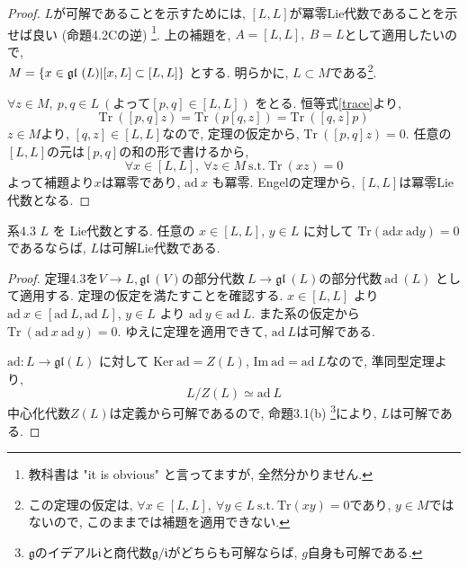 \documentclass[a4paper,12pt]{ltjsarticle}
\begin{document}
\begin{proof}
  $L$が可解であることを示すためには, $[L, L]$が冪零Lie代数であることを示せば良い (命題4.2Cの逆) \footnote{教科書は "it is obvious" と言ってますが, 全然分かりません. }. 
  上の補題を, $A = [L, L], ~B = L$として適用したいので, \\
  $M = \qty{x \in \mathfrak{gl}~(L)| [x, L] \subset [L, L]}$ とする. 明らかに, $L \subset M$である\footnote{この定理の仮定は, $∀x \in [L, L],~ ∀y \in L~ \mathrm{s.t.} ~ \mathrm{Tr}(xy) = 0$であり, $y \in M$ではないので, このままでは補題を適用できない. }. 
  

  $∀z \in M,~ p, q \in L ~(よって[p, q] \in [L, L])$ をとる. 恒等式\eqref{trace}より, 
  \begin{equation}
    \mathrm{Tr}~([p, q] z) = \mathrm{Tr}~(p [q, z]) = \mathrm{Tr}~([q, z] p)
  \end{equation}
  $z \in M$より, $[q, z] \in [L, L]$なので, 定理の仮定から, $\mathrm{Tr}~([p, q] z) = 0$. 任意の$[L, L]$の元は$[p, q]$の和の形で書けるから, 
  \begin{equation}
    ∀x \in [L, L],~ ∀z \in M~ \mathrm{s.t.}~ \mathrm{Tr}~(xz) = 0
  \end{equation}
  よって補題より$x$は冪零であり, $\mathrm{ad}~x$ も冪零. Engelの定理から, $[L, L]$は冪零Lie代数となる. 
\end{proof}


\begin{thm}{系4.3}
  $L$ を Lie代数とする. 任意の $x \in [L, L]$, $y \in L$ に対して $\mathrm{Tr} (\mathrm{ad}x ~ \mathrm{ad}y) = 0$ であるならば, $L$は可解Lie代数である.
\end{thm}

\begin{proof}
  定理4.3を$V \rightarrow L, \mathfrak{gl}~(V)の部分代数~L \rightarrow \mathfrak{gl}~(L)の部分代数~\mathrm{ad}~(L)$ として適用する. 定理の仮定を満たすことを確認する. $x \in [L, L]$ より $\mathrm{ad}~x \in [\mathrm{ad}~L, \mathrm{ad}~L]$, $y \in L$ より $\mathrm{ad}~y \in \mathrm{ad}~L$. また系の仮定から $\mathrm{Tr}~(\mathrm{ad}~x ~ \mathrm{ad}~y) = 0$. ゆえに定理を適用できて, $\mathrm{ad}~L$は可解である. 

  $\mathrm{ad} : L \rightarrow \mathfrak{gl}(L)$ に対して $\mathrm{Ker~ad}= Z(L)$, $\mathrm{Im~ad} = \mathrm{ad}~L$なので, 準同型定理より, 
  \begin{equation}
    L / Z(L) \simeq \mathrm{ad}~L
  \end{equation}
  中心化代数$Z(L)$は定義から可解であるので, 命題3.1(b) \footnote{$\mathfrak{g}$のイデアル$\mathfrak{i}$と商代数$\mathfrak{g/i}$がどちらも可解ならば, $g$自身も可解である. }により, $L$は可解である. 
\end{proof}
\end{document}
